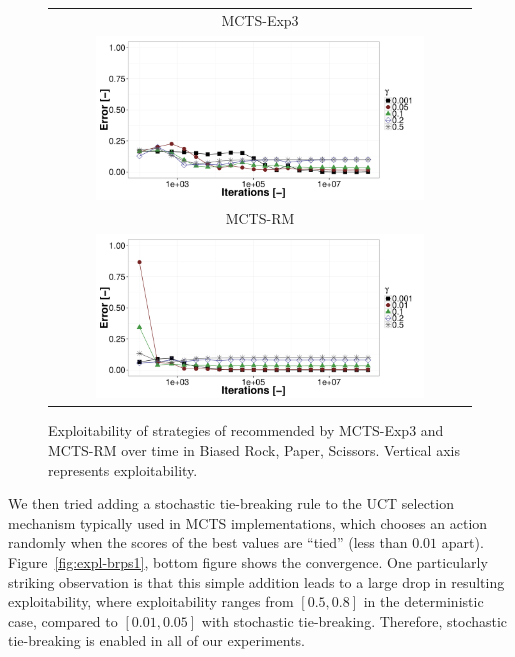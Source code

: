 \begin{figure}[t!]
\centering
\begin{tabular}{c}
{\small MCTS-Exp3} \\
\includegraphics[width=0.8\textwidth]{figures/brps-MCTS-EXP3.pdf} \\
{\small MCTS-RM} \\
\includegraphics[width=0.8\textwidth]{figures/brps-MCTS-RM.pdf} \\
\end{tabular}
\caption{Exploitability of strategies of recommended by MCTS-Exp3 and MCTS-RM over time in Biased Rock, Paper, Scissors. Vertical axis represents exploitability. }
\label{fig:expl-brps2}
\end{figure}

We then tried adding a stochastic tie-breaking rule to the UCT selection mechanism typically used in MCTS implementations, which chooses an
action randomly when the scores of the best values are ``tied'' (less than $0.01$ apart).
Figure~\ref{fig:expl-brps1}, bottom figure shows the convergence.
One particularly striking observation is that this simple addition leads to a large drop in resulting exploitability, where exploitability
ranges from $[0.5,0.8]$ in the deterministic case, compared to $[0.01,0.05]$ with stochastic tie-breaking. Therefore, stochastic tie-breaking is
enabled in all of our experiments.

